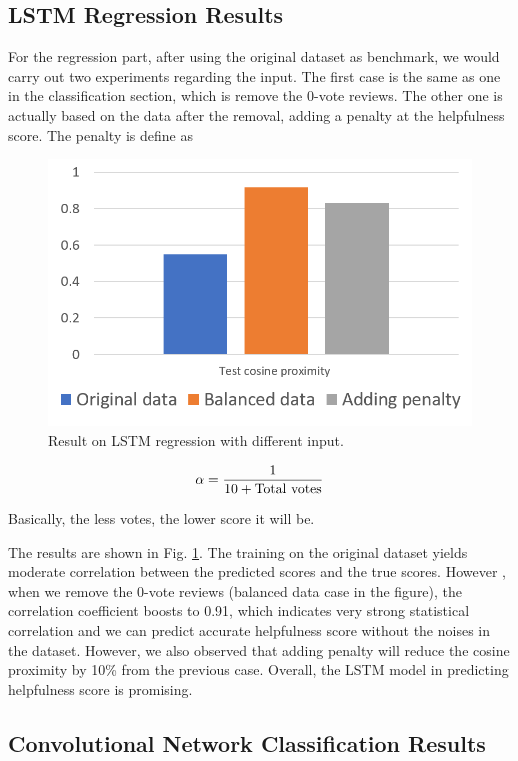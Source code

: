 \documentclass[11pt]{article}
\begin{document}
\subsection{LSTM Regression Results}

For the regression part, after using the original dataset as benchmark, we would carry out two experiments regarding the input. The first case is the same as one in the classification section, which is remove the 0-vote reviews. The other one is actually based on the data after the removal, adding a penalty at the helpfulness score. The penalty is define as 

\begin{figure}[tbp]
    \centering
    \includegraphics[width=0.9\linewidth]{figures/acc_f1_comp_ip_reg.png}
    \caption{Result on LSTM regression with different input.}
    \label{result_acc_f1_comp_ip_reg}
\end{figure}

$$\alpha = \frac{1}{10+{\rm Total~votes}}$$

Basically, the less votes, the lower score it will be. 

The results are shown in Fig. \ref{result_acc_f1_comp_ip_reg}. The training on the original dataset yields moderate correlation between the predicted scores and the true scores. However , when we remove the 0-vote reviews (balanced data case in the figure), the correlation coefficient boosts to 0.91, which indicates very strong statistical correlation and we can predict accurate helpfulness score without the noises in the dataset. However, we also observed that adding penalty will reduce the cosine proximity by 10\% from the previous case.  Overall, the LSTM model in predicting helpfulness score is promising.

\subsection{Convolutional Network Classification Results}
\end{document}
